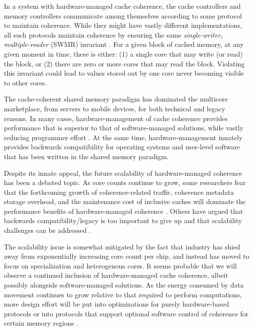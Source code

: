 In a system with hardware-managed cache coherence, the cache controllers and memory controllers
communicate among themselves according to some protocol to maintain coherence.
While they might have vastly different implementations, 
all such protocols maintain coherence by ensuring the same {\em single-writer, multiple-reader} (SWMR) invariant \cite{sorin2011primer}. 
For a given block of cached memory, at any given moment in time, there is either: 
(1) a single core that may write (or read) the block, or 
(2) there are zero or more cores that may read the block.
Violating this invariant could lead to values stored out by one core never becoming visible to other cores.

The cache-coherent shared memory paradigm has dominated the multicore marketplace, from servers to mobile devices,
for both technical and legacy reasons.
In many cases, hardware-management of cache coherence provides performance that is superior
to that of software-managed solutions, while vastly reducing programmer effort \cite{leverich-isca07}.
At the same time, hardware-management innately provides backwards compatibility for operating systems and user-level software that has been written in the shared memory paradigm.

Despite its innate appeal, the future scalability of hardware-managed coherence has been a debated topic.
As core counts continue to grow, some researchers fear that the forthcoming growth of
coherence-related traffic, coherence metadata storage overhead, and the maintenance cost of inclusive caches
will dominate the performance benefits of hardware-managed coherence
\cite{choi2011denovo, kelm2011cohesion, howard201048}.
Others have argued that backwards compatibility/legacy is too important to give up and that scalability challenges can be addressed \cite{martin2012chip}.

The scalability issue is somewhat mitigated by the fact that industry has shied away from exponentially increasing core count per chip, and instead has moved to focus on specialization and heterogenous cores.
It seems probable that we will observe a continued inclusion of hardware-managed cache coherence, albeit possibly alongside software-managed solutions.
As the energy consumed by data movement continues to grow relative to that required to perform computations, more design effort will be put into optimizations for purely hardware-based protocols
or into protocols that support optional software control of coherence for certain memory regions \cite{kelm2011cohesion}.

